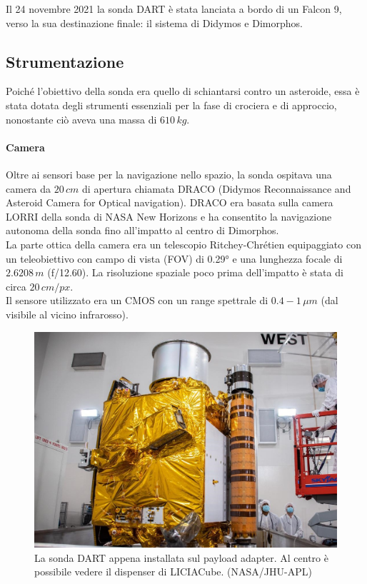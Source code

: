 \documentclass[a4paper,11pt,openright]{book}
\begin{document}
Il 24 novembre 2021 la sonda DART è stata lanciata a bordo di un Falcon 9, verso la sua destinazione finale: il sistema di Didymos e Dimorphos.

\subsection{Strumentazione}
Poiché l'obiettivo della sonda era quello di schiantarsi contro un asteroide, essa è stata dotata degli strumenti essenziali per la fase di crociera e di approccio, nonostante ciò aveva una massa di $610\,kg$.

\paragraph*{Camera}
Oltre ai sensori base per la navigazione nello spazio, la sonda ospitava una camera da $20\,cm$ di apertura chiamata DRACO (Didymos Reconnaissance and Asteroid Camera for Optical navigation). DRACO era basata sulla camera LORRI della sonda di NASA New Horizons e ha consentito la navigazione autonoma della sonda fino all'impatto al centro di Dimorphos.\\
La parte ottica della camera era un telescopio Ritchey-Chrétien equipaggiato con un teleobiettivo con campo di vista (FOV) di 0.29° e una lunghezza focale di $2.6208\,m$ (f/12.60). La risoluzione spaziale poco prima dell'impatto è stata di circa $20\,cm/px$.\\
Il sensore utilizzato era un CMOS con un range spettrale di $0.4-1\,\mu m$ (dal visibile al vicino infrarosso).

\begin{figure}
    \centering
    \includegraphics[scale=0.4]{figure/dart_cleanroom.jpg}
    \caption[La sonda DART nella clean room.]{La sonda DART appena installata sul payload adapter. Al centro è possibile vedere il dispenser di LICIACube. (NASA/JHU-APL)}
    \label{fig:dart_cleanroom}
\end{figure}
\end{document}
